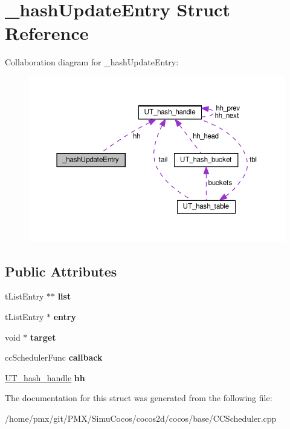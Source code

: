 \hypertarget{struct__hashUpdateEntry}{}\section{\+\_\+hash\+Update\+Entry Struct Reference}
\label{struct__hashUpdateEntry}


Collaboration diagram for \+\_\+hash\+Update\+Entry\+:
\nopagebreak
\begin{figure}[H]
\begin{center}
\leavevmode
\includegraphics[width=350pt]{struct__hashUpdateEntry__coll__graph}
\end{center}
\end{figure}
\subsection*{Public Attributes}
\begin{DoxyCompactItemize}
\item 
\mbox{\label{struct__hashUpdateEntry_a099f9312202b45ff69bfd21d32a77ae9}} 
t\+List\+Entry $\ast$$\ast$ {\bfseries list}
\item 
\mbox{\label{struct__hashUpdateEntry_a2a44083f4da27a8a5b1bb9ce57030da8}} 
t\+List\+Entry $\ast$ {\bfseries entry}
\item 
\mbox{\label{struct__hashUpdateEntry_a88a7166aef27fad9b0292dc2a8bbd7b3}} 
void $\ast$ {\bfseries target}
\item 
\mbox{\label{struct__hashUpdateEntry_a08dfe18687f9e952691351fa88cf57cb}} 
cc\+Scheduler\+Func {\bfseries callback}
\item 
\mbox{\label{struct__hashUpdateEntry_aa81fb210b05621f4aaa098a44a156e49}} 
\hyperlink{structUT__hash__handle}{U\+T\+\_\+hash\+\_\+handle} {\bfseries hh}
\end{DoxyCompactItemize}


The documentation for this struct was generated from the following file\+:\begin{DoxyCompactItemize}
\item 
/home/pmx/git/\+P\+M\+X/\+Simu\+Cocos/cocos2d/cocos/base/C\+C\+Scheduler.\+cpp\end{DoxyCompactItemize}
